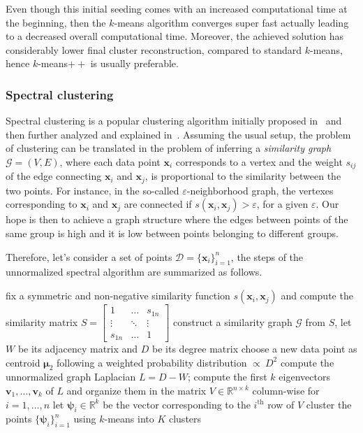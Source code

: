 	Even though this initial seeding comes with an increased computational time at the beginning, then the $k$-means algorithm converges super fast actually leading to a decreased overall computational time. Moreover, the achieved solution has considerably lower final cluster reconstruction, compared to standard $k$-means, hence $k$-means$++$ is usually preferable.
    
    \subsubsection{Spectral clustering} \label{sec:spectral_clustering}
	Spectral clustering is a popular clustering algorithm initially proposed in~\cite{shi2000normalized} and then further analyzed and explained in~\cite{ng2002spectral, von2007tutorial}.
	Assuming the usual setup, the problem of clustering can be translated in the problem of inferring a \textit{similarity graph} $\mathcal{G} = (V, E)$, where each data point $\bm{x}_i$ corresponds to a vertex and the weight $s_{ij}$ of the edge connecting $\bm{x}_i$ and $\bm{x}_j$, is proportional to the similarity between the two points.
	For instance, in the so-called $\varepsilon$-neighborhood graph, the vertexes corresponding to $\bm{x}_i$ and $\bm{x}_j$ are connected if $s(\bm{x}_i, \bm{x}_j) > \varepsilon$, for a given $\varepsilon$.
	Our hope is then to achieve a graph structure where the edges between points of the same group is high and it is low between points belonging to different groups.

	Therefore, let's consider a set of points $\mathcal{D}=\{\bm{x}_i\}_{i=1}^n$, the steps of the unnormalized spectral algorithm are summarized as follows.
	\begin{algorithm}[h!]
	\begin{algorithmic}[1]
		\State fix a symmetric and non-negative similarity function $s(\bm{x}_i, \bm{x}_j)$ and compute the similarity matrix $S=
		\begin{bmatrix}
		1       & \dots & s_{1n} \\
		\vdots & \ddots & \vdots \\
		s_{1n}       & \dots & 1
		\end{bmatrix}
		$
		\State construct a similarity graph $\mathcal{G}$ from $S$, let $W$ be its adjacency matrix and $D$ be its degree matrix
		\State choose a new data point as centroid $\bm{\mu}_2$ following a weighted probability distribution $\propto~D^2$
		\State compute the unnormalized graph Laplacian $L = D - W$;
		\State compute the first $k$ eigenvectors $\bm{v}_1, \dots, \bm{v}_k$ of $L$ and organize them in the matrix $V \in \mathbb{R}^{n \times k}$ column-wise
		\State for $i=1,\dots,n$ let $\bm{\psi}_i \in \mathbb{R}^k$ be the vector corresponding to the $i^{\text{th}}$ row of $V$
		\State cluster the points $\{\bm{\psi}_i\}_{i=1}^n$ using $k$-means into $K$ clusters
	\end{algorithmic}
	\end{algorithm}

